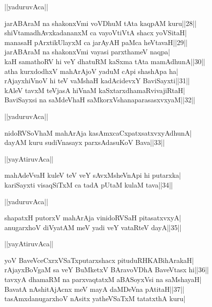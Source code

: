 \documentclass{article}
\begin{document}
\begin{center}
||yaduruvAca||
\end{center}

jarABAraM na shakonxVmi voVDhuM tAta kaqpAM kuru||28||\\
shiVtamadhAvxkadananxM ca vayoVtiVtA shacx yoVSitaH|\\
manasaH pArxtikUlayxM ca jarAyAH paMca heVtavaH||29||\\
jarABAraM na shakonxVmi vayasi parxthameV naqpa|\\
kaH samathoRV hi veY dhatuRM kaSxma tAta mamAdhunA||30||\\
atha kurxdodhxV mahArAjoV yaduM cApi shashApa ha|\\
rAjayxhiVnoV hi teV vaMshaH kadAcidevxY BaviSayxti||31||\\
kAleV tavxM teVjasA hiVnaM kaSxtarxdhamaRvivajiRtaH|\\
BaviSayxsi na saMdeVhaH saMkorxVshanaparasasxvxyaM||32||\\

\begin{center}
||yaduruvAca||
\end{center}

nidoRVSoVhaM mahArAja kasAmxcaCxpatxsatxvxyAdhunA|\\
dayAM kuru sudiVnasayx parxsAdasuKoV Bava||33||\\

\begin{center}
||yayAtiruvAca||
\end{center}

mahAdeVvaH kuleV teV veY sAvxMsheVnApi hi putarxka|\\
kariSayxti visaqSiTxM ca tadA pUtaM kulaM tava||34||\\

\begin{center}
||yaduruvAca||
\end{center}

shapatxH putorxV mahArAja vinidoRVSaH pitasatxvxyA|\\
anugarxhoV diVyatAM meV yadi veY vataRteV dayA||35||\\

\begin{center}
||yayAtiruvAca||
\end{center}

yoV BaveVceCxrxVSaTxputarxshacx pituduRHKABihArakaH|\\
rAjayxBoVgaM sa veY BuMketxV BAravoVDhA BaveVtasx hi||36||\\
tavxyA dhamaRM na parxvaqtatxM aBASoyxVsi na saMshayaH|\\
BavatA nAshitAjAcnx meV mayA daMDeVna pAtitaH||37||\\
tasAmxdanugarxhoV nAsitx yatheVSaTxM tatatxthA kuru|\\
\end{document}
